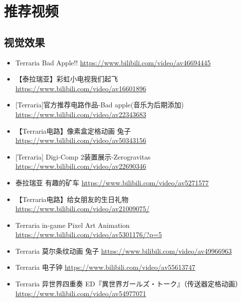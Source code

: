 \chapter{推荐视频}
\section{视觉效果}
\begin{itemize}
\item Terraria Bad Apple!! \url{https://www.bilibili.com/video/av46694445}
\item 【泰拉瑞亚】彩虹小电视我们起飞 \url{https://www.bilibili.com/video/av16601896}
\item {[}Terraria]官方推荐电路作品-Bad apple(音乐为后期添加) \url{https://www.bilibili.com/video/av22343683}
\item 【Terraria电路】像素盒定格动画 兔子 \url{https://www.bilibili.com/video/av50343156}
\item {[}Terraria] Digi-Comp 2装置展示-Zerogravitas \url{https://www.bilibili.com/video/av22690346}
\item 泰拉瑞亚 有趣的矿车 \url{https://www.bilibili.com/video/av5271577}
\item 【Terraria电路】给女朋友的生日礼物 \url{https://www.bilibili.com/video/av21009075/}
\item Terraria in-game Pixel Art Animation \url{https://www.bilibili.com/video/av5301176/?p=5}
\item Terraria 莫尔条纹动画 兔子 \url{https://www.bilibili.com/video/av49966963}
\item Terraria 电子钟 \url{https://www.bilibili.com/video/av55613747}
\item Terraria 异世界四重奏 ED『異世界ガールズ・トーク』（传送器定格动画） \url{https://www.bilibili.com/video/av54977071}
\end{itemize}

